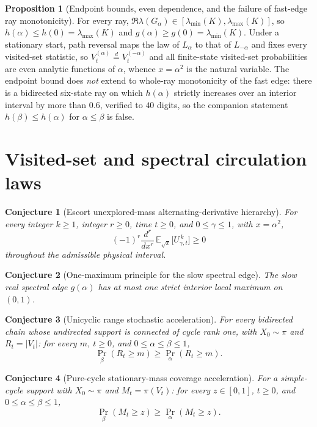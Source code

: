 \documentclass[11pt]{article}
\newtheorem{conjecture}{Conjecture}
\theoremstyle{definition}
\newtheorem{proposition}{Proposition}
\begin{document}
\begin{proposition}[Endpoint bounds, even dependence, and the failure of fast-edge ray monotonicity]\label{ao:basic}
For every ray, $\Re\lambda(G_\alpha)\in[\lambda_{\min}(K),\lambda_{\max}(K)]$, so $h(\alpha)\le h(0)=\lambda_{\max}(K)$ and $g(\alpha)\ge g(0)=\lambda_{\min}(K)$.  Under a stationary start, path reversal maps the law of $L_\alpha$ to that of $L_{-\alpha}$ and fixes every visited-set statistic, so $V_t^{(\alpha)}\overset d=V_t^{(-\alpha)}$ and all finite-state visited-set probabilities are even analytic functions of $\alpha$, whence $x=\alpha^2$ is the natural variable.  The endpoint bound does \emph{not} extend to whole-ray monotonicity of the fast edge: there is a bidirected six-state ray on which $h(\alpha)$ strictly increases over an interior interval by more than $0.6$, verified to $40$ digits, so the companion statement $h(\beta)\le h(\alpha)$ for $\alpha\le\beta$ is false.
\end{proposition}

\section{Visited-set and spectral circulation laws}

\begin{conjecture}[Escort unexplored-mass alternating-derivative hierarchy]\label{ao1}
For every integer $k\ge1$, integer $r\ge0$, time $t\ge0$, and $0\le\gamma\le1$, with $x=\alpha^2$,
\[
(-1)^r\frac{d^r}{dx^r}\,\mathbb E_{\sqrt x}\!\bigl[U_{\gamma,t}^{\,k}\bigr]\ge0
\]
throughout the admissible physical interval.
\end{conjecture}

\begin{conjecture}[One-maximum principle for the slow spectral edge]\label{ao2}
The slow real spectral edge $g(\alpha)$ has at most one strict interior local maximum on $(0,1)$.
\end{conjecture}

\begin{conjecture}[Unicyclic range stochastic acceleration]\label{ao3}
For every bidirected chain whose undirected support is connected of cycle rank one, with $X_0\sim\pi$ and $R_t=|V_t|$: for every $m$, $t\ge0$, and $0\le\alpha\le\beta\le1$,
\[
\Pr_\beta(R_t\ge m)\ge\Pr_\alpha(R_t\ge m).
\]
\end{conjecture}

\begin{conjecture}[Pure-cycle stationary-mass coverage acceleration]\label{ao4}
For a simple-cycle support with $X_0\sim\pi$ and $M_t=\pi(V_t)$: for every $z\in[0,1]$, $t\ge0$, and $0\le\alpha\le\beta\le1$,
\[
\Pr_\beta(M_t\ge z)\ge\Pr_\alpha(M_t\ge z).
\]
\end{conjecture}
\end{document}
